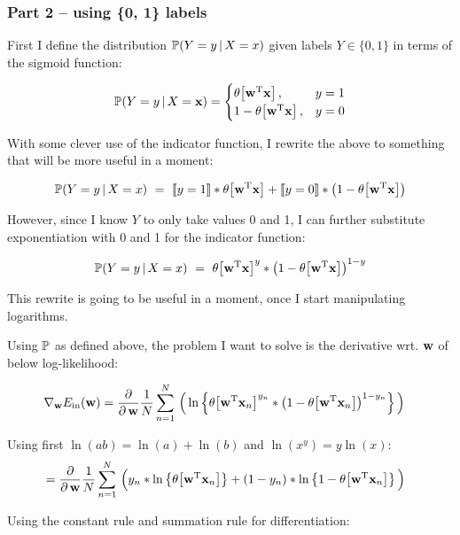 \subsubsection{Part 2 -- using \{0, 1\} labels}

First I define the distribution $\P (Y = y \, |\, X = x)$ given labels $Y \in \{0,
1\}$ in terms of the sigmoid function:

\begin{align*}
  \P(Y = y\,|\,X = \mbf x) = 
  \begin{cases}
    \mysigx,     &y = 1\\
    1 - \mysigx, &y = 0
  \end{cases}
\end{align*}

With some clever use of the indicator function, I rewrite the above to something
that will be more useful in a moment:

\begin{align*}
  \P(Y = y\,|\,X = x) \ =\ \booltoint{y = 1} * \mysigx + \booltoint{y = 0} * \left(1 -
  \mysigx\right)
\end{align*}

However, since I know $Y$ to only take values 0 and 1, I can further substitute
exponentiation with 0 and 1 for the indicator function:

\begin{align*}
  \P(Y = y\,|\,X = x) \ =\ \mysigx^y * \left(1 - \mysigx\right)^{1 - y}
\end{align*}

This rewrite is going to be useful in a moment, once I start manipulating logarithms.

Using $\P $ as defined above, the problem I want to solve is the derivative wrt.
$\mbf w$ of below log-likelihood:

\begin{align*}
  \nabla_{\mbf w} E_\text{in}(\mbf w)&= \ddw \meanN\Big( \lnb{\mysig^{y_n} *
  \left(1 - \mysig\right)^{1 - y_n}}\Big)
\end{align*}

\noindent Using first $\ln (ab) = \ln (a) + \ln (b)$ and $\ln (x^y) = y \ln (x)$:
\begin{align*}
  &= \ddw \meanN\Big( y_n * \lnb{\mysig} +
  (1 - y_n) * \lnb{1 - \mysig}\Big)
\end{align*}

\noindent Using the constant rule and summation rule for differentiation:


